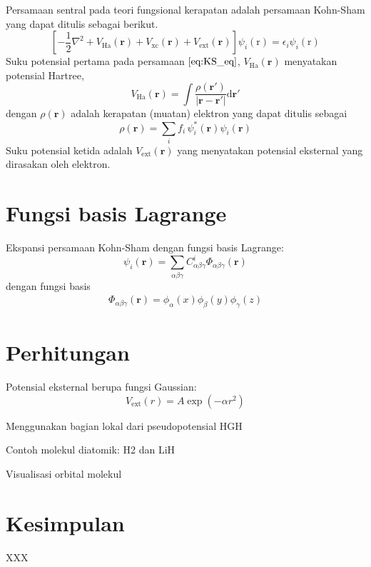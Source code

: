 \documentclass[%
reprint,
amsmath,
amssymb,
aps,
]{revtex4-1}
\begin{document}
Persamaan sentral pada teori fungsional kerapatan adalah persamaan
Kohn-Sham yang dapat ditulis sebagai berikut.
\begin{equation}
\left[
-\frac{1}{2}\nabla^2
+ V_{\mathrm{Ha}}(\mathbf{r})
+ V_{\mathrm{xc}}(\mathbf{r})
+ V_{\mathrm{ext}}(\mathbf{r})
\right]\psi_{i}(\mathrm{r}) =
\epsilon_{i} \psi_{i}(\mathrm{r})
\label{eq:KS_eq}
\end{equation}
Suku potensial pertama pada persamaan $\eqref{eq:KS_eq}$,
$V_{\mathrm{Ha}}(\mathbf{r})$ menyatakan potensial Hartree,
\begin{equation}
V_{\mathrm{Ha}}(\mathbf{r}) =
\int
\frac{\rho(\mathbf{r}')}{\left|\mathbf{r} - \mathbf{r}'\right|}
\mathrm{d}\mathbf{r}'
\end{equation}
dengan $\rho(\mathbf{r})$ adalah kerapatan (muatan) elektron
yang dapat ditulis sebagai
\begin{equation}
\rho(\mathbf{r}) = \sum_{i} f_{i}\, \psi^{*}_{i}(\mathbf{r}) \psi_{i}(\mathbf{r})
\end{equation}
Suku potensial ketida adalah $V_{\mathrm{ext}}(\mathbf{r})$
yang menyatakan potensial eksternal yang dirasakan oleh elektron.


\section{Fungsi basis Lagrange}

Ekspansi persamaan Kohn-Sham dengan fungsi basis Lagrange:
\begin{equation}
\psi_{i}(\mathbf{r}) = \sum_{\alpha\beta\gamma}
C^{i}_{\alpha\beta\gamma} \Phi_{\alpha\beta\gamma}(\mathbf{r})
\end{equation}
dengan fungsi basis
\begin{eqnarray}
\Phi_{\alpha\beta\gamma}(\mathbf{r}) =
\phi_{\alpha}(x)\phi_{\beta}(y)\phi_{\gamma}(z)
\end{eqnarray}


\section{Perhitungan}

Potensial eksternal berupa fungsi Gaussian:
\begin{equation}
V_{\mathrm{ext}}(r) = A\exp(-\alpha r^2)
\end{equation}

Menggunakan bagian lokal dari pseudopotensial HGH

Contoh molekul diatomik: H2 dan LiH

Visualisasi orbital molekul

\section{Kesimpulan}

XXX
\end{document}
